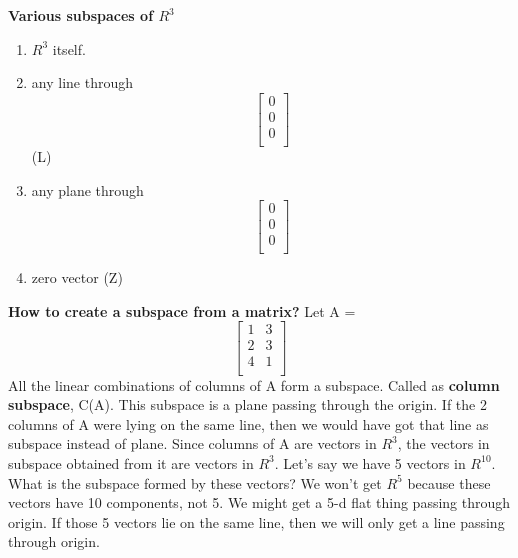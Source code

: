 \documentclass{article}
\begin{document}
\textbf{Various subspaces of $R^3$}
\begin{enumerate}
    \item $R^3$ itself. 
    \item any line through \[
\begin{bmatrix}
0\\
0\\
0\\
\end{bmatrix}
\] (L)
    \item any plane through \[
\begin{bmatrix}
0\\
0\\
0\\
\end{bmatrix}
\]
    \item zero vector (Z)
    
\end{enumerate}
\textbf{How to create a subspace from a matrix?}\newline
Let A  = \[
\begin{bmatrix}
1 & 3\\
2& 3\\
4 & 1\\
\end{bmatrix}
\]
All the linear combinations of columns of A form a subspace. Called as \textbf{column subspace}, C(A). This subspace is a plane passing through the origin. If the 2 columns of A were lying on the same line, then we would have got that line as subspace instead of plane.
Since columns of A are vectors in $R^3$, the vectors in subspace obtained from it are vectors in $R^3$.
\newline
Let's say we have 5 vectors in $R^{10}$. What is the subspace formed by these vectors? \newline
We won't get $R^5$ because these vectors have 10 components, not 5. We might get a 5-d flat thing passing through origin. If those 5 vectors lie on the same line, then we will only get a line passing through origin.
\end{document}
